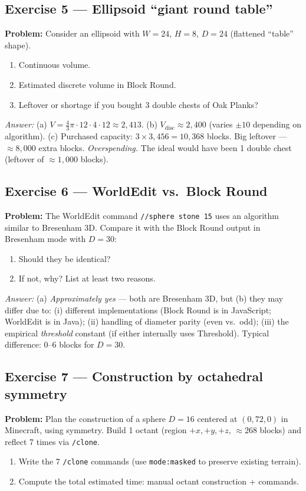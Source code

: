 \documentclass[12pt,a4paper]{scrartcl}
\newcommand{\cmd}[1]{\textcolor{earth}{\texttt{\small #1}}}
\begin{document}
\subsection*{Exercise 5 --- Ellipsoid \enquote{giant round table}}
\textbf{Problem:} Consider an ellipsoid with $W = 24$, $H = 8$, $D = 24$ (flattened \enquote{table} shape).
\begin{enumerate}[label=\alph*),leftmargin=1.5em,itemsep=0.1em,topsep=0.2em,nosep]
  \item Continuous volume.
  \item Estimated discrete volume in Block Round.
  \item Leftover or shortage if you bought 3 double chests of Oak Planks?
\end{enumerate}

\emph{Answer:}
(a) $V = \tfrac{4}{3}\pi \cdot 12 \cdot 4 \cdot 12 \approx 2{,}413$.
(b) $V_{\mathrm{disc}} \approx 2{,}400$ (varies $\pm 10$ depending on algorithm).
(c) Purchased capacity: $3 \times 3{,}456 = 10{,}368$ blocks. Big leftover --- $\approx 8{,}000$ extra blocks. \emph{Overspending.} The ideal would have been 1 double chest (leftover of $\approx 1{,}000$ blocks).

\subsection*{Exercise 6 --- WorldEdit vs.\ Block Round}
\textbf{Problem:} The WorldEdit command \cmd{//sphere stone 15} uses an algorithm similar to Bresenham 3D. Compare it with the Block Round output in Bresenham mode with $D = 30$:
\begin{enumerate}[label=\alph*),leftmargin=1.5em,itemsep=0.1em,topsep=0.2em,nosep]
  \item Should they be identical?
  \item If not, why? List at least two reasons.
\end{enumerate}

\emph{Answer:}
(a) \emph{Approximately yes} --- both are Bresenham 3D, but (b) they may differ due to: (i) different implementations (Block Round is in JavaScript; WorldEdit is in Java); (ii) handling of diameter parity (even vs.\ odd); (iii) the empirical \emph{threshold} constant (if either internally uses Threshold). Typical difference: 0--6 blocks for $D = 30$.

\subsection*{Exercise 7 --- Construction by octahedral symmetry}
\textbf{Problem:} Plan the construction of a sphere $D = 16$ centered at $(0, 72, 0)$ in Minecraft, using symmetry. Build 1 octant (region $+x, +y, +z$, $\approx 268$ blocks) and reflect 7 times via \cmd{/clone}.
\begin{enumerate}[label=\alph*),leftmargin=1.5em,itemsep=0.1em,topsep=0.2em,nosep]
  \item Write the 7 \cmd{/clone} commands (use \cmd{mode:masked} to preserve existing terrain).
  \item Compute the total estimated time: manual octant construction + commands.
\end{enumerate}
\end{document}
